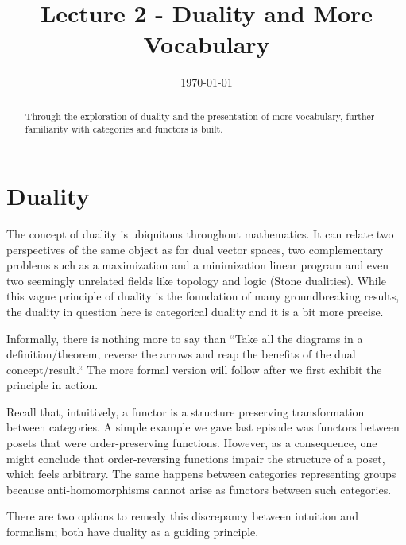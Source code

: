 \documentclass{article}
\title{Lecture 2 - Duality and More Vocabulary\vspace{-10pt}}
\date{\vspace{-30pt}\today\vspace{-15pt}}  %
\theoremstyle{definition}
\theoremstyle{remark}
\begin{document}
\maketitle
\begin{abstract} Through the exploration of duality and the presentation of more vocabulary, further familiarity with categories and functors is built.
\end{abstract}
\section{Duality}
The concept of duality is ubiquitous throughout mathematics. It can relate two perspectives of the same object as for dual vector spaces, two complementary problems such as a maximization and a minimization linear program and even two seemingly unrelated fields like topology and logic (Stone dualities). While this vague principle of duality is the foundation of many groundbreaking results, the duality in question here is categorical duality and it is a bit more precise.

Informally, there is nothing more to say than ``Take all the diagrams in a definition/theorem, reverse the arrows and reap the benefits of the dual concept/result.`` The more formal version will follow after we first exhibit the principle in action.

Recall that, intuitively, a functor is a structure preserving transformation between categories. A simple example we gave last episode was functors between posets that were order-preserving functions. However, as a consequence, one might conclude that order-reversing functions impair the structure of a poset, which feels arbitrary. The same happens between categories representing groups because anti-homomorphisms cannot arise as functors between such categories.

There are two options to remedy this discrepancy between intuition and formalism; both have duality as a guiding principle.

\end{document}
